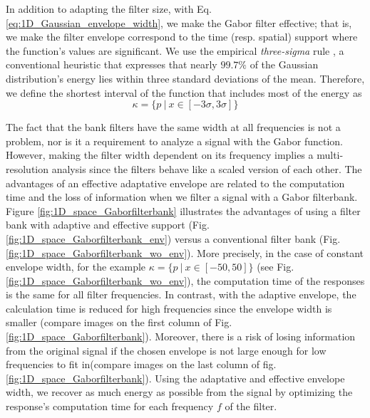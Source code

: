 In addition to adapting the filter size, with Eq. \eqref{eq:1D_Gaussian_envelope_width}, we make the Gabor filter effective; that is, we make the filter envelope correspond to the time (resp. spatial) support where the function's values are significant. We use the empirical \textit{three-sigma} rule \cite{Pukelsheim:AMSTAT:1994}, a conventional heuristic that expresses that nearly $99.7\%$ of the Gaussian distribution's energy lies within three standard deviations of the mean. Therefore, we define the shortest interval of the function that includes most of the energy as 
\begin{equation}
	\kappa = \lbrace p ~|~ x \in [-3\sigma, 3\sigma] \rbrace \label{eq:1D_gabor_support}
\end{equation}

The fact that the bank filters have the same width at all frequencies is not a problem, nor is it a requirement to analyze a signal with the Gabor function. However, making the filter width dependent on its frequency implies a multi-resolution analysis since the filters behave like a scaled version of each other. The advantages of an effective adaptative envelope are related to the computation time and the loss of information when we filter a signal with a Gabor filterbank. Figure \ref{fig:1D_space_Gaborfilterbank} illustrates the advantages of using a filter bank with adaptive and effective support (Fig. \ref{fig:1D_space_Gaborfilterbank_env}) versus a conventional filter bank (Fig. \ref{fig:1D_space_Gaborfilterbank_wo_env}). More precisely, in the case of constant envelope width, for the example $\kappa = \lbrace p ~|~ x \in [-50, 50] \rbrace$ (see Fig. \ref{fig:1D_space_Gaborfilterbank_wo_env}), the computation time of the responses is the same for all filter frequencies. In contrast, with the adaptive envelope, the calculation time is reduced for high frequencies since the envelope width is smaller (compare images on the first column of Fig. \ref{fig:1D_space_Gaborfilterbank}). Moreover, there is a risk of losing information from the original signal if the chosen envelope is not large enough for low frequencies to fit in(compare images on the last column of fig. \ref{fig:1D_space_Gaborfilterbank}). Using the adaptative and effective envelope width, we recover as much energy as possible from the signal by optimizing the response's computation time for each frequency $f$ of the filter.

